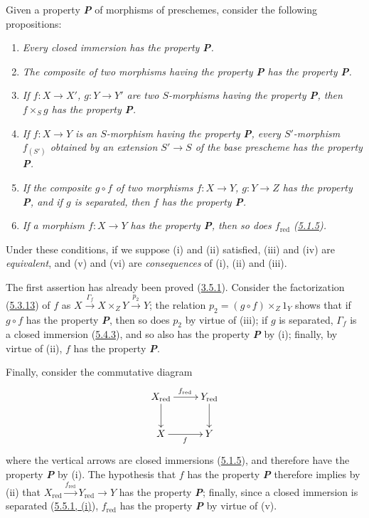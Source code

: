 \begin{remark}[5.5.12]
\label{I.5.5.12}
\normalfont Given a property \textbf{\textit{P}} of morphisms of preschemes,
consider the following propositions:
\begin{enumerate}
  \item[\rm(i)] \emph{Every closed immersion has the property \textbf{\textup{P}}.}
  \item[\rm(ii)] \emph{The composite of two morphisms having the property
    \textbf{\textup{P}} has the property \textbf{\textup{P}}.}
  \item[\rm(iii)] \emph{If $f:X\to X'$, $g:Y\to Y'$ are two $S$-morphisms
    having the property \textbf{\textup{P}}, then $f\times_S g$ has the property
    \textbf{\textup{P}}.}

  \item[\rm(iv)] \emph{If $f:X\to Y$ is an $S$-morphism having the
    property \textbf{P}, every $S'$-morphism $f_{(S')}$ obtained by an
    extension $S'\to S$ of the base prescheme has the property
    \textbf{P}.}
  \item[\rm(v)] \emph{If the composite $g\circ f$ of two morphisms
    $f:X\to Y$, $g:Y\to Z$ has the property \textbf{P}, and if $g$ is
    separated, then $f$ has the property \textbf{P}.}
  \item[\rm(vi)] \emph{If a morphism $f:X\to Y$ has the
    property \textbf{P}, then so does $f_{\mathrm{red}}$
    (\hyperref[I.5.1.5]{5.1.5}).}
\end{enumerate}

Under these conditions, if we suppose (i) and (ii) satisfied, (iii) and (iv)
are \emph{equivalent}, and (v) and (vi) are \emph{consequences} of (i), (ii)
and (iii).

The first assertion has already been proved
(\hyperref[I.3.5.1]{3.5.1}). Consider the factorization
(\hyperref[I.5.3.13]{5.3.13}) of $f$ as
$X\xrightarrow{\Gamma_f}X\times_Z Y\xrightarrow{p_2}Y$; the relation
$p_2=(g\circ f)\times_Z 1_Y$ shows that if $g\circ f$ has the property
\textbf{\textit{P}}, then so does $p_2$ by virtue of (iii); if $g$ is separated,
$\Gamma_f$ is a closed immersion
(\hyperref[I.5.4.3]{5.4.3}), and so also has the property \textbf{\textit{P}} by
(i); finally, by virtue of (ii), $f$ has the property \textbf{\textit{P}}.

Finally, consider the commutative diagram
\[
  \xymatrix{
    X_{\mathrm{red}}\ar[r]^{f_{\mathrm{red}}}\ar[d] &
    Y_{\mathrm{red}}\ar[d]\\
    X\ar[r]_f &
    Y
  }
\]
where the vertical arrows are closed immersions
(\hyperref[I.5.1.5]{5.1.5}), and therefore have the property \textbf{\textit{P}} by
(i). The hypothesis that $f$ has the property \textbf{\textit{P}} therefore implies by
(ii) that
$X_{\mathrm{red}}\xrightarrow{f_{\mathrm{red}}}Y_{\mathrm{red}}\to Y$
has the property \textbf{\textit{P}}; finally, since a closed immersion is
separated (\hyperref[I.5.5.1]{5.5.1, (i)}), $f_{\mathrm{red}}$ has the
property \textbf{\textit{P}} by virtue of (v).


\end{remark}
